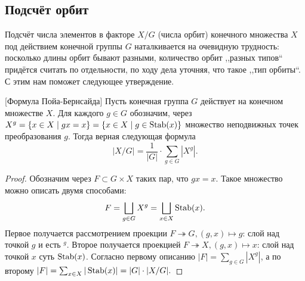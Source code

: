 \subsection{Подсчёт орбит}
Подсчёт числа элементов в факторе $X/G$ (числа орбит) конечного множества $X$ под действием конечной группы $G$ наталкивается на очевидную трудность: посколько длины орбит бывают разными, количество орбит ,,разных типов`` придётся считать по отдельности, по ходу дела уточняя, что такое ,,тип орбиты``. С этим нам поможет следующее утверждение. 
\begin{theorem}\label{th:burnside}
    [Формула Пойа-Бернсайда]
    Пусть конечная группа $G$ действует на конечном множестве $X$. Для каждого $g \in G$ обозначим, через $X^g = \{x \in X \mid gx = x\} = \{x \in X \mid g \in \operatorname{Stab}(x)\}$ множество неподвижных точек преобразования $g$. Тогда верная следующая формула \[
        |X/G| = \frac{1}{|G|}\cdot \sum_{g \in G} |X^g|.
    \]
\end{theorem}
\begin{proof}
    Обозначим через $F \subset G \times X$ таких пар, что $gx = x$. Такое множество можно описать двумя способами: 
    \[
        F = \bigsqcup_{g\in G} X^g = \bigsqcup_{x \in X} \operatorname{Stab}(x).
    \]
    Первое получается рассмотрением проекции $F \twoheadrightarrow G, (g, x) \mapsto g$: слой над точкой $g$ и есть $^g$. Второе получается проекцией $F \twoheadrightarrow X, (g, x)\mapsto x$: слой над точкой $x$ суть $\operatorname{Stab}(x)$. Согласно первому описанию $|F| = \sum_{g \in G} |X^g|$, а по второму $|F| = \sum_{x \in X} |\operatorname{Stab}(x)| = |G| \cdot |X/G|.$
\end{proof}

